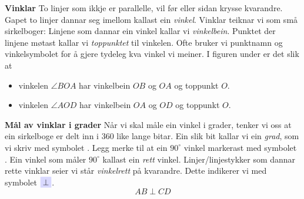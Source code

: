 \textbf{Vinklar} \label{vinklar}\os
To linjer som ikkje er parallelle, vil før eller sidan krysse kvarandre. Gapet to linjer dannar seg imellom kallast ein \textit{vinkel}. Vinklar teiknar vi som små sirkelboger:
Linjene som dannar ein vinkel kallar vi \textit{vinkelbein}. Punktet der linjene møtast kallar vi \textit{toppunktet} til vinkelen. Ofte bruker vi punktnamn og vinkelsymbolet \sym{$ \angle $} for å gjere tydeleg kva vinkel vi meiner. I figuren under er det slik at
\begin{itemize}
\item vinkelen $ \angle BOA $  har vinkelbein $ OB $ og $ OA $ og toppunkt $ O $.
\item vinkelen $ \angle AOD $  har vinkelbein $ OA $ og $ OD $ og toppunkt $ O $.	
\end{itemize}
\newpage
\textbf{Mål av vinklar i grader}\os
Når vi skal måle ein vinkel i grader, tenker vi oss at ein sirkelboge er delt inn i 360 like lange bitar. Ein slik bit kallar vi ein \textit{grad}, som vi skriv med symbolet \sym{$ ^\circ $}. 
 \vsk
Legg merke til at ein $ 90^\circ $ vinkel markerast med symbolet \sym{$ \square $}. Ein vinkel som måler $ 90^\circ $ kallast ein \textit{rett} vinkel. Linjer/linjestykker som dannar rette vinklar seier vi står \textit{vinkelrett} på kvarandre. Dette indikerer vi med symbolet $ \sym{$ \perp $} $.
\[ AB\perp CD \]
\newpage
{}\vsk
\label{vinkelend}
\newpage
{}

